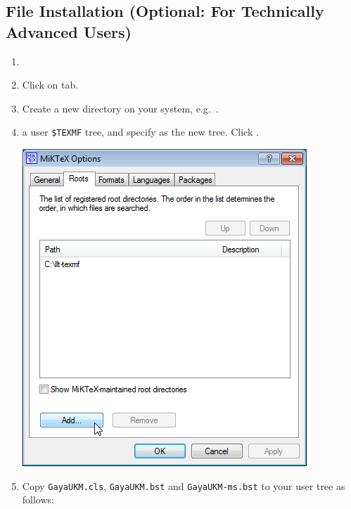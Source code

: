 \documentclass[a4paper,12pt]{scrartcl}
\begin{document}
\subsection{File Installation (Optional: For Technically Advanced Users)}

\begin{enumerate}
\item {}
\item Click on  tab.
\item Create a new directory on your system, e.g.~.
\item {} a user \texttt{\$TEXMF} tree, and specify  as the new tree. Click .
\begin{center}
\includegraphics[width=.455\linewidth]{user-texmf}
\end{center}

\item Copy \texttt{GayaUKM.cls}, \texttt{GayaUKM.bst} and \texttt{GayaUKM-ms.bst} to your user tree as follows:%

\begin{minipage}{.5\textwidth}
\end{minipage}


\end{enumerate}
\end{document}
